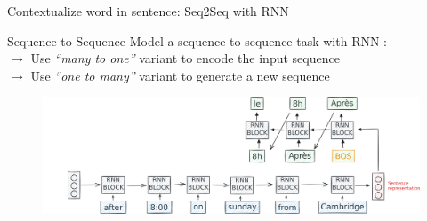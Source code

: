 \documentclass[10pt,aspectratio=169]{beamer}
\begin{document}
  \begin{frame}[noframenumbering]{Contextualize word in sentence: Seq2Seq with RNN}

    \begin{block}{Sequence to Sequence}
      \vspace{.1cm}
      {\footnotesize
        Model a sequence to sequence task with RNN :\\ 
        $\rightarrow $ Use \textit{``many to one''} variant to encode the input sequence\\
        $\rightarrow $ Use \textit{``one to many''} variant to generate a new sequence\\
      } 
    \end{block}

    \begin{figure}
      \centering
      \includegraphics[width=1.\textwidth]{img/RNN-example-seq2seq-4.pdf}
    \end{figure}


  \end{frame}
\end{document}
